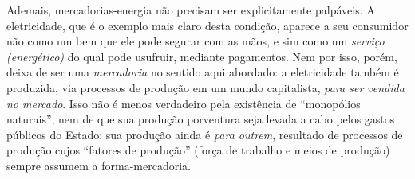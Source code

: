 Ademais, mercadorias-energia não precisam ser explicitamente palpáveis. A eletricidade, que é o exemplo mais claro desta condição, aparece a seu consumidor não como um bem que ele pode segurar com as mãos, e sim como um \textit{serviço (energético)} do qual pode usufruir, mediante pagamentos. Nem por isso, porém, deixa de ser uma \textit{mercadoria} no sentido aqui abordado: a eletricidade também é produzida, via processos de produção em um mundo capitalista, \textit{para ser vendida no mercado}. Isso não é menos verdadeiro pela existência de ``monopólios naturais'', nem de que sua produção porventura seja levada a cabo pelos gastos públicos do Estado: sua produção ainda é \textit{para outrem}, resultado de processos de produção cujos ``fatores de produção'' (força de trabalho e meios de produção) sempre assumem a forma-mercadoria. 





